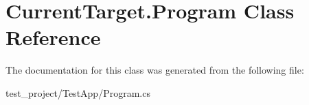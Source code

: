 \hypertarget{class_current_target_1_1_program}{\section{Current\-Target.\-Program Class Reference}
\label{class_current_target_1_1_program}
}


The documentation for this class was generated from the following file\-:\begin{DoxyCompactItemize}
\item 
test\-\_\-project/\-Test\-App/Program.\-cs\end{DoxyCompactItemize}
